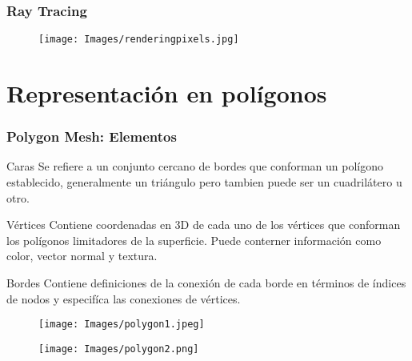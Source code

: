 \documentclass{beamer}
\begin{document}
\begin{frame}
\frametitle{Ray Tracing}
\begin{figure}[h]
\texttt{[image: Images/renderingpixels.jpg]}
\centering
\end{figure}
\end{frame}




\section{Representaci\' on en pol\' igonos}
\begin{frame}
\frametitle{Polygon Mesh: Elementos}
\begin{block}{Caras}
Se refiere a un conjunto cercano de bordes que conforman un pol\' igono establecido, generalmente un tri\' angulo pero tambien puede ser un cuadril\' atero u otro.
\end{block}
\begin{block}{V\' ertices}
Contiene coordenadas en 3D de cada uno de los v\' ertices que conforman los pol\' igonos limitadores de la superficie.  Puede conterner informaci\' on como color, vector normal y textura.
\end{block}
\begin{block}{Bordes}
Contiene definiciones de la conexi\' on de cada borde en t\' erminos de \' indices de nodos y especif\' ica las conexiones de v\' ertices.
\end{block}

\end{frame}

\begin{frame}
\begin{figure}[hbtp]
\centering
\texttt{[image: Images/polygon1.jpeg]}
\end{figure}
\begin{figure}[hbtp]
\texttt{[image: Images/polygon2.png]} 
\end{figure}
\end{frame}
\end{document}
